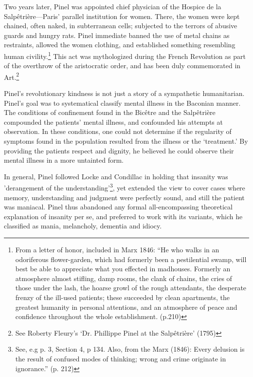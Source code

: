 Two years later, Pinel was appointed chief physician of the Hospice de la Salpêtrière---Paris' parallel institution for women. There, the women were kept chained, often naked, in subterranean cells; subjected to the terrors of abusive guards and hungry rats. Pinel immediate banned the use of metal chains as restraints, allowed the women clothing, and established something resembling human civility.\footnote{From a letter of honor, included in Marx 1846: “He who walks in an odoriferous flower-garden, which had formerly been a pestilential swamp, will best be able to appreciate what you effected in madhouses. Formerly an atmosphere almost stifling, damp rooms, the clank of chains, the cries of those under the lash, the hoarse growl of the rough attendants, the desperate frenzy of the ill-used patients; these succeeded by clean apartments, the greatest humanity in personal attentions, and an atmosphere of peace and confidence throughout the whole establishment. (p.210)} This act was mythologized during the French Revolution as part of the overthrow of the aristocratic order, and has been duly commemorated in Art.\footnote{See Roberty Fleury's `Dr. Phillippe Pinel at the Salpêtrière' (1795)}

Pinel's revolutionary kindness is not just a story of a sympathetic humanitarian. Pinel's goal was to systematical classify mental illness in the Baconian manner. The conditions of confinement found in the Bicêtre and the Salpêtrière compounded the patients' mental illness, and confounded his attempts at observation. In these conditions, one could not determine if the regularity of symptoms found in the population resulted from the illness or the ‘treatment.’ By providing the patients respect and dignity, he believed he could observe their mental illness in a more untainted form.

In general, Pinel followed Locke and Condillac in holding that insanity was 'derangement of the understanding’\footnote{See, e.g p. 3, Section 4, p 134. Also, from the Marx (1846): Every delusion is the result of confused modes of thinking; wrong and crime originate in ignorance.” (p. 212)}, yet extended the view to cover cases where memory, understanding and judgment were perfectly sound, and still the patient was maniacal. Pinel thus abandoned any formal all-encompassing theoretical explanation of insanity per se, and preferred to work with its variants, which he classified as mania, melancholy, dementia and idiocy.

